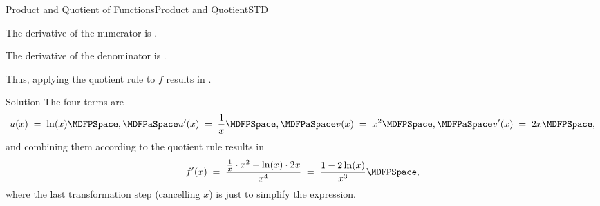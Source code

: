 \begin{MXContent}{Product and Quotient of Functions}{Product and Quotient}{STD}
\begin{MExercise}
\begin{MExerciseItems}
\item{The derivative of the numerator  is .}
\item{The derivative of the denominator  is .}
\item{Thus, applying the quotient rule to $f$ results in .}
\end{MExerciseItems}
\begin{MHint}{Solution}
The four terms are 
$$
u(x) \;=\; \ln(x) \MDFPSpace , \MDFPaSpace
u'(x) \;=\; \frac1x \MDFPSpace , \MDFPaSpace
v(x) \;=\; x^2 \MDFPSpace , \MDFPaSpace
v'(x) \;=\; 2x \MDFPSpace ,
$$
and combining them according to the quotient rule results in
$$
f'(x) \;=\; \frac{\frac1x\cdot x^2-\ln(x)\cdot 2x}{x^4} \; =\; \frac{1-2\ln(x)}{x^3} \MDFPSpace,
$$
where the last transformation step (cancelling $x$) is just to simplify the expression.
\end{MHint}
\end{MExercise}
\end{MXContent}


